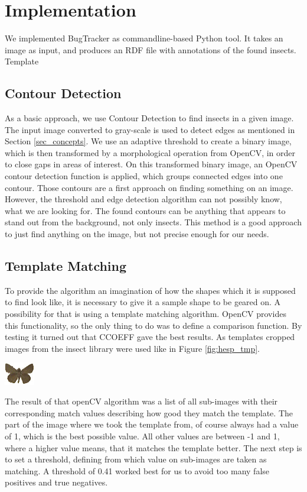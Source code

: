 \section{Implementation}
\label{sec_implementation}

We implemented BugTracker as commandline-based Python tool.
It takes an image as input, and produces an RDF file with annotations of the found insects.
Template

\subsection{Contour Detection}
As a basic approach, we use Contour Detection to find insects in a given image.
The input image converted to gray-scale is used to detect edges as mentioned in Section \ref{sec_concepts}.
We use an adaptive threshold to create a binary image, which is then transformed by a morphological operation from OpenCV, in order to close gaps in areas of interest.
On this transformed binary image, an OpenCV contour detection function is applied, which groups connected edges into one contour.
Those contours are a first approach on finding something on an image.
However, the threshold and edge detection algorithm can not possibly know, what we are looking for.
The found contours can be anything that appears to stand out from the background, not only insects.
This method is a good approach to just find anything on the image, but not precise enough for our needs.


\subsection{Template Matching}
To provide the algorithm an imagination of how the shapes which it is supposed to find look like, it is necessary to give it a sample shape to be geared on.
A possibility for that is using a template matching algorithm.
OpenCV provides this functionality, so the only thing to do was to define a comparison function.
By testing it turned out that CCOEFF gave the best results.
As templates cropped images from the insect library were used like in Figure \ref{fig:hesp_tmp}.
\begin{center}
	\includegraphics[width=0.1\textwidth]{images/hesp_template.jpg}
	\label{fig:hesp_tmp}
\end{center}
The result of that openCV algorithm was a list of all sub-images with their corresponding match values describing how good they match the template.
The part of the image where we took the template from, of course always had a value of 1, which is the best possible value.
All other values are between -1 and 1, where a higher value means, that it matches the template better.
The next step is to set a threshold, defining from which value on sub-images are taken as matching.
A threshold of 0.41 worked best for us to avoid too many false positives and true negatives.

